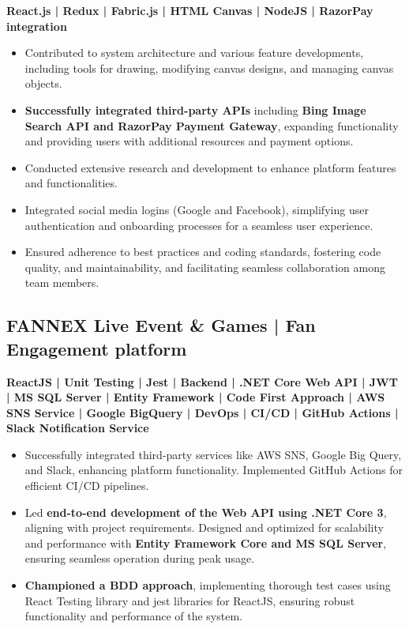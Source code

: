 \documentclass[letterpaper]{deedy-resume} %
\begin{document}
\begin{minipage}[t]{0.66\textwidth}
\textbf{React.js | Redux | Fabric.js | HTML Canvas | NodeJS | RazorPay integration} \\
\vspace{-\topsep}
\begin{itemize}
    \setlength\itemsep{-0.5em} %
    \item Contributed to system architecture and various feature developments, including tools for drawing, modifying canvas designs, and managing canvas objects.
    \item \textbf{Successfully integrated third-party APIs} including \textbf{Bing Image Search API and RazorPay Payment Gateway}, expanding functionality and providing users with additional resources and payment options.
    \item Conducted extensive research and development to enhance platform features and functionalities.
    \item Integrated social media logins (Google and Facebook), simplifying user authentication and onboarding processes for a seamless user experience.
    \item Ensured adherence to best practices and coding standards, fostering code quality, and maintainability, and facilitating seamless collaboration among team members.
\end{itemize}

\sectionspace %




\subsection{FANNEX Live Event \& Games\href{https://fannexlive.com/}{\texorpdfstring{\faExternalLink}{}} | Fan Engagement 
platform}

\textbf{ReactJS | Unit Testing | Jest | Backend | .NET Core Web API | JWT | MS SQL Server | Entity Framework | Code First Approach | AWS SNS Service | Google BigQuery | DevOps | CI/CD | GitHub Actions | Slack Notification Service} \\
\vspace{-\topsep}
\begin{itemize}
    \setlength\itemsep{-0.5em} %
    \item Successfully integrated third-party services like AWS SNS, Google Big Query, and Slack, enhancing platform functionality. Implemented GitHub Actions for efficient CI/CD pipelines.
    \item Led \textbf{end-to-end development of the Web API using .NET Core 3}, aligning with project requirements. Designed and optimized for scalability and performance with \textbf{Entity Framework Core and MS SQL Server}, ensuring seamless operation during peak usage.
    \item \textbf{Championed a BDD approach}, implementing thorough test cases using React Testing library and jest libraries for ReactJS, ensuring robust functionality and performance of the system.
\end{itemize}


\end{minipage}
\end{document}
